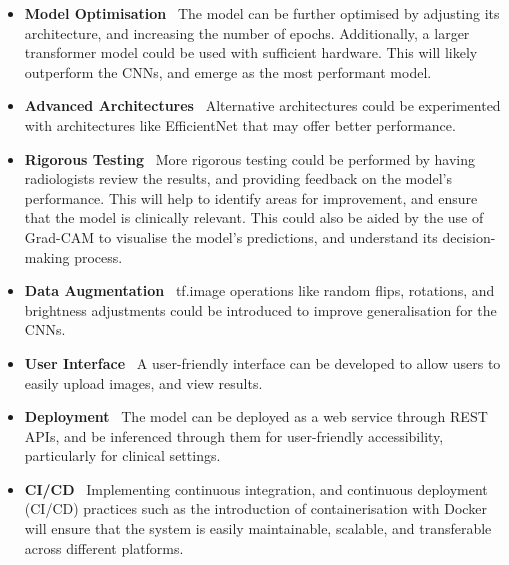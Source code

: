 \documentclass[../main]{subfiles}
\begin{document}
\begin{itemize}
	\item \textbf{Model Optimisation} \textemdash\ The model can be further optimised by adjusting its architecture, and increasing the number of epochs. Additionally, a larger transformer model could be used with sufficient hardware. This will likely outperform the CNNs, and emerge as the most performant model.
	\item \textbf{Advanced Architectures} \textemdash\ Alternative architectures could be experimented with architectures like EfficientNet that may offer better performance.
    \item \textbf{Rigorous Testing} \textemdash\ More rigorous testing could be performed by having radiologists review the results, and providing feedback on the model's performance. This will help to identify areas for improvement, and ensure that the model is clinically relevant. This could also be aided by the use of Grad-CAM to visualise the model's predictions, and understand its decision-making process.
	\item \textbf{Data Augmentation} \textemdash\ tf.image operations like random flips, rotations, and brightness adjustments could be introduced to improve generalisation for the CNNs.
	\item \textbf{User Interface} \textemdash\ A user-friendly interface can be developed to allow users to easily upload images, and view results.
	\item \textbf{Deployment} \textemdash\ The model can be deployed as a web service through REST APIs, and be inferenced through them for user-friendly accessibility, particularly for clinical settings.
	\item \textbf{CI/CD} \textemdash\ Implementing continuous integration, and continuous deployment (CI/CD) practices such as the introduction of containerisation with Docker will ensure that the system is easily maintainable, scalable, and transferable across different platforms.
\end{itemize}
\end{document}
